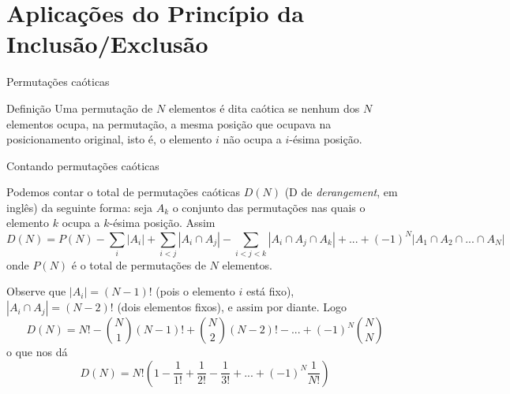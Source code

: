 \section*{Aplicações do Princípio da Inclusão/Exclusão}

\begin{frame}[fragile]{Permutações caóticas}

    \begin{block}{Definição}
        Uma permutação de $N$ elementos é dita caótica se nenhum dos $N$ elementos ocupa, na 
        permutação, a mesma posição que ocupava na posicionamento original, isto é, o elemento $i$ não
        ocupa a $i$-ésima posição.
    \end{block}

\end{frame}

\begin{frame}[fragile]{Contando permutações caóticas}

    Podemos contar o total de permutações caóticas $D(N)$ (D de \textit{derangement}, em inglês) da
seguinte forma: seja $A_k$ o conjunto das permutações nas quais o elemento $k$ ocupa a $k$-ésima
posição. Assim
\[
        D(N) = P(N) - \sum_{i} | A_i | + \sum_{i<j}| A_i \cap  A_j | - \sum_{i<j<k}| A_i \cap  A_j \cap  A_k | 
             + ... + (-1)^N | A_1 \cap  A_2 \cap  ... \cap  A_N |
\]
onde $P(N)$ é o total de permutações de $N$ elementos. 

Observe que $|A_i| = (N - 1)!$ (pois o elemento $i$ está fixo), $|A_i \cap A_j| = (N - 2)!$ (dois elementos fixos), e assim por diante.
Logo
\[
        D(N) = N! - \binom{N}{1}(N - 1)! + \binom{N}{2}(N - 2)! - ... + (-1)^N \binom{N}{N}
\]
o que nos dá
\[
        D(N) = N!\left(1 - \frac{1}{1!} + \frac{1}{2!} - \frac{1}{3!} + ... + (-1)^N\frac{1}{N!}\right)
\]

\end{frame}
